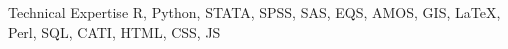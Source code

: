 
\begin{rSection}{Technical Expertise}
\textsf{R}, Python, STATA, SPSS, SAS, EQS, AMOS, GIS, {\LaTeX}, Perl, SQL, CATI, HTML, CSS, JS

\end{rSection}




















